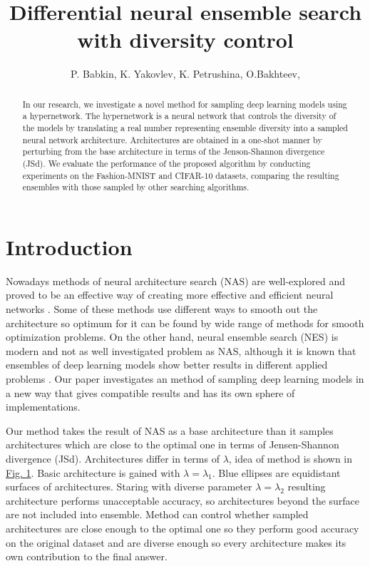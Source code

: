 \documentclass{article}
\title{Differential neural ensemble search with diversity control}
\author{P. Babkin, K. Yakovlev, K. Petrushina, O.Bakhteev,
}
\date{}
\begin{document}
\maketitle

\begin{abstract}
	
In our research, we investigate a novel method for sampling deep learning models using a hypernetwork. The hypernetwork is a neural network that controls the diversity of the models by translating a real number representing ensemble diversity into a sampled neural network architecture. Architectures are obtained in a one-shot manner by perturbing from the base architecture in terms of the Jenson-Shannon divergence (JSd). We evaluate the performance of the proposed algorithm by conducting experiments on the Fashion-MNIST and CIFAR-10 datasets, comparing the resulting ensembles with those sampled by other searching algorithms.

\end{abstract}



\section{Introduction}

Nowadays methods of neural architecture search (NAS) are well-explored and proved to be an effective way of creating
more effective and efficient neural networks \citep{darts, robustify, xnas}. Some of these methods use different ways to smooth out the architecture so optimum for it can
be found by wide range of methods for smooth optimization problems. On the other hand, neural ensemble search (NES) is
modern and not as well investigated problem as NAS, although it is known that ensembles of deep learning models show better
results in different applied problems \citep{multi-head}.
Our paper investigates an method of sampling deep learning models in a new way that gives compatible results and has its own sphere
of implementations.

Our method takes the result of NAS as a base architecture than it samples architectures which are close to the optimal one in terms of Jensen-Shannon divergence (JSd). Architectures differ in terms of $\lambda$, idea of method is shown in \hyperref[fig:arch]{Fig. 1}. Basic architecture is gained with $\lambda = \lambda_1$.
Blue ellipses are equidistant surfaces of architectures. Staring with diverse parameter $\lambda = \lambda_2$ resulting architecture performs unacceptable accuracy, so architectures beyond the surface are not included into ensemble.
Method can control whether sampled architectures are close enough to the optimal one so they perform good accuracy on the original dataset and are diverse enough so every architecture makes its own contribution to the final answer.
\end{document}
